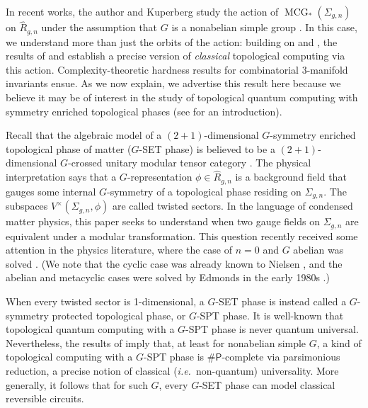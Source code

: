 \documentclass[10pt,twocolumn,amsmath,amssymb,aps,pra,secnumarabic,
    nofootinbib,groupedaddress]{revtex4-1}
\newcommand{\shP}{\mathsf{\#P}}
\newcommand{\MCG}{\operatorname{MCG}}
\newcommand{\hR}{\hat{R}}
\begin{document}
In recent works, the author and Kuperberg study the action of $\MCG_*(\Sigma_{g,n})$ on $\hR_{g,n}$ under the assumption that $G$ is a nonabelian simple group \cite{KuperbergSamperton:zombies, KuperbergSamperton:coloring}.  In this case, we understand more than just the orbits of the action: building on \cite{DunfieldThurston:random} and \cite{RobertsVenkatesh:full}, the results of \cite{KuperbergSamperton:coloring} and \cite{KuperbergSamperton:zombies} establish a precise version of \emph{classical} topological computing via this action.  Complexity-theoretic hardness results for combinatorial 3-manifold invariants ensue.  As we now explain, we advertise this result here because we believe it may be of interest in the study of topological quantum computing with symmetry enriched topological phases (see \cite{DelaneyWang:defects} for an introduction).

Recall that the algebraic model of a $(2+1)$-dimensional $G$-symmetry enriched topological phase of matter ($G$-SET phase) is believed to be a $(2+1)$-dimensional $G$-crossed unitary modular tensor category \cite{BBCW:gauging}.  The physical interpretation says that a $G$-representation $\phi \in \hR_{g,n}$ is a background field that gauges some internal $G$-symmetry of a topological phase residing on $\Sigma_{g,n}$.  The subspaces $V^\times(\Sigma_{g,n},\phi)$ are called twisted sectors.  In the language of condensed matter physics, this paper seeks to understand when two gauge fields on $\Sigma_{g,n}$ are equivalent under a modular transformation.  This question recently received some attention in the physics literature, where the case of $n=0$ and $G$ abelian was solved \cite{BarkeshliWen:Z2, BBCW:gauging}.  (We note that the cyclic case was already known to Nielsen \cite{Nielsen:periodisher}, and the abelian and metacyclic cases were solved by Edmonds in the early 1980s \cite{Edmonds:symmetry1, Edmonds:symmetry2}.)

When every twisted sector is 1-dimensional, a $G$-SET phase is instead called a $G$-symmetry protected topological phase, or $G$-SPT phase.  It is well-known that topological quantum computing with a $G$-SPT phase is never quantum universal.  Nevertheless, the results of \cite{KuperbergSamperton:zombies, KuperbergSamperton:coloring}  imply that, at least for nonabelian simple $G$, a kind of topological computing with a $G$-SPT phase is $\shP$-complete via parsimonious reduction, a precise notion of classical (\emph{i.e.}~non-quantum) universality.  More generally, it follows that for such $G$, every $G$-SET phase can model classical reversible circuits.
\end{document}
